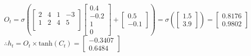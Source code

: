 \documentclass{article}
\begin{document}
\begin{enumerate}
    $
    O_t=\sigma(
    \begin{bmatrix}
    2&4&1&-3\\
    1&2&4&5\\
    \end{bmatrix}
    \begin{bmatrix}
    0.4\\-0.2\\1\\0
    \end{bmatrix}
    +
    \begin{bmatrix}
    0.5\\-0.1
    \end{bmatrix})
    =\sigma(
    \begin{bmatrix}
    1.5\\3.9
    \end{bmatrix}
    )=
	\begin{bmatrix}
	0.8176\\0.9802
	\end{bmatrix}    
    $\\
    $\therefore 
    h_t=O_t \times \text{tanh}(C_t)=
    \begin{bmatrix}
    -0.3407\\0.6484
    \end{bmatrix}
    $\\\\
    

\end{enumerate}
\end{document}
